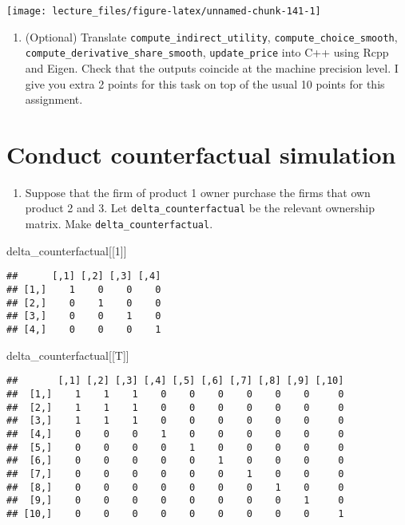 \documentclass[
]{book}
\newenvironment{Shaded}{\begin{snugshade}}{\end{snugshade}}
\newcommand{\DecValTok}[1]{\textcolor[rgb]{0.00,0.00,0.81}{#1}}
\newcommand{\NormalTok}[1]{#1}
\providecommand{\tightlist}{%
  \setlength{\itemsep}{0pt}\setlength{\parskip}{0pt}}
\begin{document}
\begin{center}\texttt{[image: lecture\_files/figure-latex/unnamed-chunk-141-1]} \end{center}

\begin{enumerate}
\def\labelenumi{\arabic{enumi}.}
\setcounter{enumi}{1}
\tightlist
\item
  (Optional) Translate \texttt{compute\_indirect\_utility}, \texttt{compute\_choice\_smooth}, \texttt{compute\_derivative\_share\_smooth}, \texttt{update\_price} into C++ using Rcpp and Eigen. Check that the outputs coincide at the machine precision level. I give you extra 2 points for this task on top of the usual 10 points for this assignment.
\end{enumerate}

\hypertarget{conduct-counterfactual-simulation}{%
\section{Conduct counterfactual simulation}\label{conduct-counterfactual-simulation}}

\begin{enumerate}
\def\labelenumi{\arabic{enumi}.}
\tightlist
\item
  Suppose that the firm of product 1 owner purchase the firms that own product 2 and 3. Let \texttt{delta\_counterfactual} be the relevant ownership matrix. Make \texttt{delta\_counterfactual}.
\end{enumerate}

\begin{Shaded}
\begin{Highlighting}[]
\NormalTok{delta\_counterfactual[[}\DecValTok{1}\NormalTok{]]}
\end{Highlighting}
\end{Shaded}

\begin{verbatim}
##      [,1] [,2] [,3] [,4]
## [1,]    1    0    0    0
## [2,]    0    1    0    0
## [3,]    0    0    1    0
## [4,]    0    0    0    1
\end{verbatim}

\begin{Shaded}
\begin{Highlighting}[]
\NormalTok{delta\_counterfactual[[T]]}
\end{Highlighting}
\end{Shaded}

\begin{verbatim}
##       [,1] [,2] [,3] [,4] [,5] [,6] [,7] [,8] [,9] [,10]
##  [1,]    1    1    1    0    0    0    0    0    0     0
##  [2,]    1    1    1    0    0    0    0    0    0     0
##  [3,]    1    1    1    0    0    0    0    0    0     0
##  [4,]    0    0    0    1    0    0    0    0    0     0
##  [5,]    0    0    0    0    1    0    0    0    0     0
##  [6,]    0    0    0    0    0    1    0    0    0     0
##  [7,]    0    0    0    0    0    0    1    0    0     0
##  [8,]    0    0    0    0    0    0    0    1    0     0
##  [9,]    0    0    0    0    0    0    0    0    1     0
## [10,]    0    0    0    0    0    0    0    0    0     1
\end{verbatim}
\end{document}
